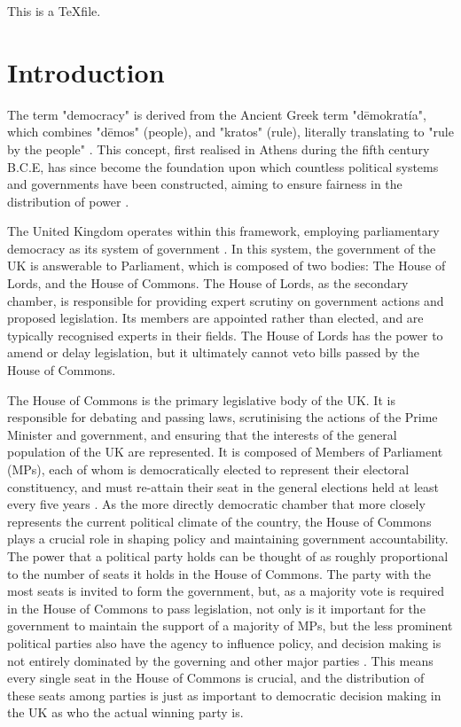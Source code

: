 \documentclass{article}
\begin{document}
This is a \TeX file.


\section{Introduction}
The term "democracy" is derived from the Ancient Greek term "dēmokratía", which combines "dēmos" (people), and "kratos" (rule), 
literally translating to "rule by the people" \cite{democracy}. This concept, first realised in Athens during the fifth century B.C.E, has since become the
foundation upon which countless political systems and governments have been constructed, aiming to ensure fairness in the distribution of power \cite{natgeo}.

The United Kingdom operates within this framework, employing parliamentary democracy as its system of government \cite{parldem}. In this system, the government of
the UK is answerable to Parliament, which is composed of two bodies: The House of Lords, and the House of Commons. The House of Lords, as the secondary chamber,
is responsible for providing expert scrutiny on government actions and proposed legislation. Its members are appointed rather than elected, and are typically 
recognised experts in their fields. The House of Lords has the power to amend or delay legislation, but it ultimately cannot veto bills passed by the House of 
Commons.

The House of Commons is the primary legislative body of the UK. It is responsible for debating and passing laws, scrutinising the actions of the Prime Minister
and government, and ensuring that the interests of the general population of the UK are represented. It is composed of Members of Parliament (MPs), each of
whom is democratically elected to represent their electoral constituency, and must re-attain their seat in the general elections held at least every five
years \cite{generalelections}. As the more directly democratic chamber that more closely represents the current political climate of the country, the House of Commons plays a crucial
role in shaping policy and maintaining government accountability. The power that a political party holds can be thought of as roughly proportional to the
number of seats it holds in the House of Commons. The party with the most seats is invited to form the government, but, as a majority vote is required in the
House of Commons to pass legislation, not only is it important for the government to maintain the support of a majority of MPs, but the less prominent political
parties also have the agency to influence policy, and decision making is not entirely dominated by the governing and other major parties \cite{divisions}.
This means every single seat in the House of Commons is crucial, and the distribution of these seats among parties is just as important to democratic decision making in the UK
as who the actual winning party is.
\end{document}
